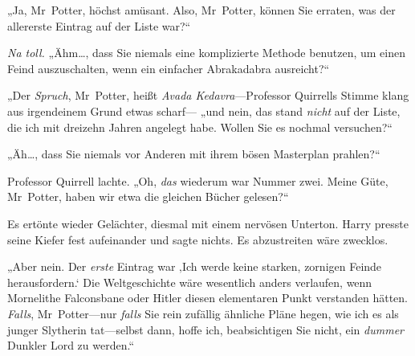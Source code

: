 „Ja, Mr~Potter, höchst amüsant. Also, Mr~Potter, können Sie erraten, was der allererste Eintrag auf der Liste war?“

\emph{Na toll.} „Ähm…, dass Sie niemals eine komplizierte Methode benutzen, um einen Feind auszuschalten, wenn ein einfacher Abrakadabra ausreicht?“

„Der \emph{Spruch}, Mr~Potter, heißt \emph{Avada Kedavra}—Professor Quirrells Stimme klang aus irgendeinem Grund etwas scharf— „und nein, das stand \emph{nicht} auf der Liste, die ich mit dreizehn Jahren angelegt habe. Wollen Sie es nochmal versuchen?“

„Äh…, dass Sie niemals vor Anderen mit ihrem bösen Masterplan prahlen?“

Professor Quirrell lachte. „Oh, \emph{das} wiederum war Nummer zwei. Meine Güte, Mr~Potter, haben wir etwa die gleichen Bücher gelesen?“

Es ertönte wieder Gelächter, diesmal mit einem nervösen Unterton. Harry presste seine Kiefer fest aufeinander und sagte nichts. Es abzustreiten wäre zwecklos.

„Aber nein. Der \emph{erste} Eintrag war ‚Ich werde keine starken, zornigen Feinde herausfordern.‘ Die Weltgeschichte wäre wesentlich anders verlaufen, wenn Mornelithe Falconsbane oder Hitler diesen elementaren Punkt verstanden hätten. \emph{Falls}, Mr~Potter—nur \emph{falls} Sie rein zufällig ähnliche Pläne hegen, wie ich es als junger Slytherin tat—selbst dann, hoffe ich, beabsichtigen Sie nicht, ein \emph{dummer} Dunkler Lord zu werden.“

